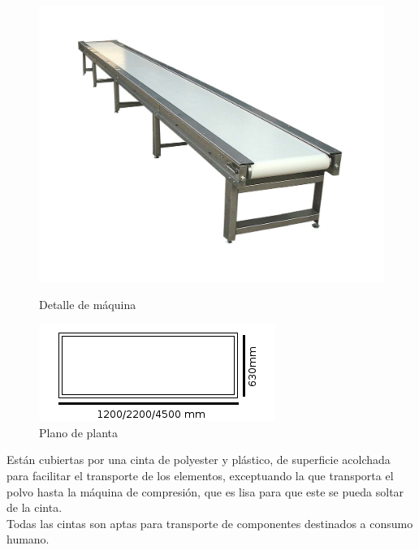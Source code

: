 	\begin{figure}[htp]
		\begin{minipage}{.48\textwidth}
			\centering
			\includegraphics[scale=0.15]{Datasheets/11Foto2.png}
			\caption{Detalle de máquina}
			\label{fig:testa}
		\end{minipage}
		\begin{minipage}{.48\textwidth}
			\centering
			\includegraphics[scale=1]{Datasheets/Miniaturas/cinta.png}
			\caption{Plano de planta}
			\label{fig:testb}
		\end{minipage}
	\end{figure}
	
	

	Están cubiertas por una cinta de polyester y plástico, de superficie acolchada para facilitar el transporte de los elementos, exceptuando la que transporta el polvo hasta la máquina de compresión, que es lisa para que este se pueda soltar de la cinta. \\

	Todas las cintas son aptas para transporte de componentes destinados a consumo humano. 

